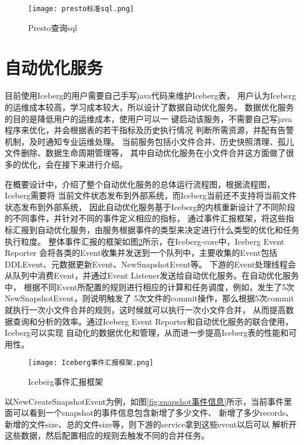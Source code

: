 \begin{figure}[H]
  \centering
  \texttt{[image: presto标准sql.png]}
  \caption{Presto查询sql}
  \label{fig:presto标准sql}
\end{figure}

\section{自动优化服务}

目前使用Iceberg的用户需要自己手写java代码来维护Iceberg表，
用户认为Iceberg的运维成本较高，学习成本较大，所以设计了数据自动优化服务。
数据优化服务的目的是降低用户的运维成本，使用户可以一
键启动该服务，不需要自己写java程序来优化，并会根据表的若干指标及历史执行情况
判断所需资源，并配有告警机制，及时通知专业运维处理。
当前服务包括小文件合并、历史快照清理、孤儿文件删除、数据生命周期管理等，
其中自动优化服务在小文件合并这方面做了很多的优化，会在接下来进行介绍。

在概要设计中，介绍了整个自动优化服务的总体运行流程图，根据流程图，Iceberg需要将
当前文件状态发布到外部系统，而Iceberg当前还不支持将当前文件状态发布到外部系统，
因此自动优化服务基于Iceberg的内核重新设计了不同阶段的不同事件，并针对不同的事件定义相应的指标，
通过事件汇报框架，将这些指标汇报到自动优化服务，由服务根据事件的类型来决定进行什么类型的优化和任务执行粒度。
整体事件汇报的框架如图\ref{fig:Iceberg事件汇报框架}所示，在Iceberg-core中，Iceberg Event Reporter
会将各类的Event收集并发送到一个队列中，主要收集的Event包括DDLEvent、元数据更新Event、NewSnapshotEvent等。
下游的Event处理线程会从队列中消费Event，并通过Event Listener发送给自动优化服务。在自动优化服务中，
根据不同Event所配置的规则进行相应的计算和任务调度，例如，发生了5次NewSnapshotEvent，则说明触发了
5次文件的commit操作，那么根据5次commit就执行一次小文件合并的规则，这时候就可以执行一次小文件合并，
从而提高数据查询和分析的效率。通过Iceberg Event Reporter和自动优化服务的联合使用，Iceberg可以实现
自动化的数据优化和管理，从而进一步提高Iceberg表的性能和可用性。

\begin{figure}[H]
  \centering
  \texttt{[image: Iceberg事件汇报框架.png]}
  \caption{Iceberg事件汇报框架}
  \label{fig:Iceberg事件汇报框架}
\end{figure}

以NewCreateSnapshotEvent为例，如图\ref{fig:snapshot事件信息}所示，当前事件里面可以看到一个snapshot的事件信息包含新增了多少文件、
新增了多少records、新增的文件size、总的文件size等，则下游的service拿到这些event以后可以
解析开这些数据，然后配置相应的规则去触发不同的合并任务。

